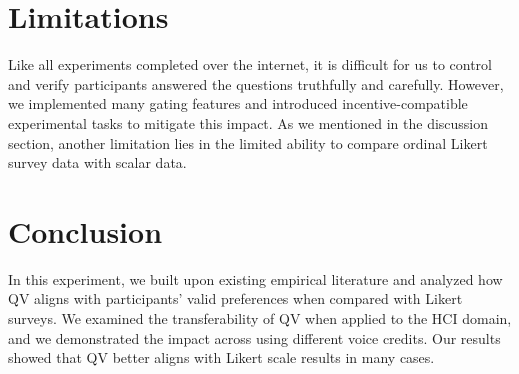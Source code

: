 \section{Limitations} \label{future}
Like all experiments completed over the internet, it is difficult for us to control and verify participants answered the questions truthfully and carefully. However, we implemented many gating features and introduced incentive-compatible experimental tasks to mitigate this impact. As we mentioned in the discussion section, another limitation lies in the limited ability to compare ordinal Likert survey data with scalar data.


\section{Conclusion} \label{conclusion}
In this experiment, we built upon existing empirical literature and analyzed how QV aligns with participants' valid preferences when compared with Likert surveys. We examined the transferability of QV when applied to the HCI domain, and we demonstrated the impact across using different voice credits. Our results showed that QV better aligns with Likert scale results in many cases.






